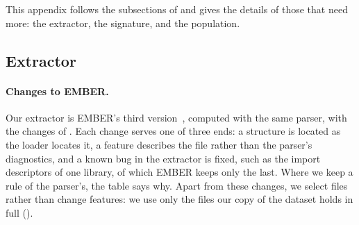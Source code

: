 
This appendix follows the subsections of  and gives the details of those that need more: the
extractor, the signature, and the population.

\subsection{Extractor}
\label{sec:ember:extractor}

\paragraph{Changes to EMBER\@.} Our extractor is EMBER's third version~\cite{joyce2025ember}, computed with the
same parser, with the changes of . Each change serves one of three ends: a structure is
located as the loader locates it, a feature describes the file rather than the parser's diagnostics, and a known bug in
the extractor is fixed, such as the import descriptors of one library, of which EMBER keeps only the last. Where we
keep a rule of the parser's, the table says why. Apart from these changes, we select files rather than change features:
we use only the files our copy of the dataset holds in full ().

